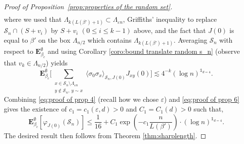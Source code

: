 \documentclass[10pt,a4paper]{amsart}
\numberwithin{equation}{section}
\begin{document}
\begin{proof}[Proof of Proposition~\textup{\ref{prop:properties of the random set}}]
\begin{multline}
		\end{multline}
	where we used that $\Lambda_{k(L(\beta')+1)}\subset \Lambda_{\varepsilon n}$, Griffiths' inequality to replace $\mathcal S_n\cap (S+v_i)$ by $S+v_i$ $(0\leq i \leq k-1)$ above, and the fact that $J(0)$ is equal to $\beta'$ on the box $\Lambda_{n/2}$ which contains $\Lambda_{k(L(\beta')+1)}$. Averaging $\mathcal S_n$ with respect to $\mathbf E^\emptyset_{\beta_c}$ and using Corollary \ref{coro:bound translate random s_n} (observe that $v_k\in \Lambda_{n/2}$) yields
	\begin{equation}\label{eq:proof of prop 6}
		\mathbf E_{\beta_c}^{\emptyset}\Big[\sum_{\substack{x\in \mathcal S_n\setminus\Lambda_{\varepsilon n}\\y\notin \mathcal S_n, \: y\sim x}}\langle \sigma_0\sigma_x\rangle_{\mathcal S_n,J(0)}J_{xy}(0)\Big]\lesssim 4^{-k} (\log n)^{\mathds{1}_{d=4}}.
	\end{equation}
	Combining \eqref{eq:proof of prop 4} (recall how we chose $\varepsilon$) and \eqref{eq:proof of prop 6} gives the existence of $c_1=c_1(\varepsilon,d)>0$ and $C_1=C_1(d)>0$ such that,
	\begin{equation}
		\mathbf E_{\beta_c}^\emptyset[\varphi_{J(0)}(\mathcal S_n)]\leq \frac{1}{16}+C_1\exp\left(-c_1\frac{n}{L(\beta')}\right)\cdot (\log n)^{\mathds{1}_{d=4}}.
	\end{equation}
	The desired result then follows from Theorem \ref{thm:sharplength}.
	\end{proof}
\end{document}
